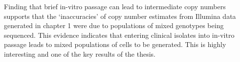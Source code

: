 \documentclass{article}
\begin{document}
Finding that brief in-vitro passage can lead to intermediate copy numbers supports that the `inaccuracies' of copy number estimates from Illumina data generated in chapter 1 were due to populations of mixed genotypes being sequenced. This evidence indicates that entering clinical isolates into in-vitro passage leads to mixed populations of cells to be generated. This is highly interesting and one of the key results of the thesis.







%

\end{document}
